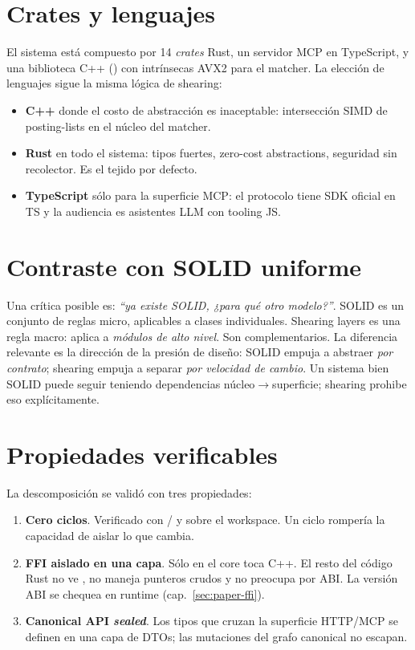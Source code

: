 \section{Crates y lenguajes}

El sistema está compuesto por 14 \emph{crates} Rust, un servidor
MCP en TypeScript, y una biblioteca C++ ()
con intrínsecas AVX2 para el matcher. La elección de lenguajes
sigue la misma lógica de shearing:

\begin{itemize}
    \item \textbf{C++} donde el costo de abstracción es inaceptable:
    intersección SIMD de posting-lists en el núcleo del matcher.
    \item \textbf{Rust} en todo el sistema: tipos fuertes, zero-cost
    abstractions, seguridad sin recolector. Es el tejido por
    defecto.
    \item \textbf{TypeScript} sólo para la superficie MCP: el
    protocolo tiene SDK oficial en TS y la audiencia es
    asistentes LLM con tooling JS.
\end{itemize}

\section{Contraste con SOLID uniforme}

Una crítica posible es: \emph{``ya existe SOLID, ¿para qué otro
modelo?''}. SOLID es un conjunto de reglas micro, aplicables a
clases individuales. Shearing layers es una regla macro: aplica a
\emph{módulos de alto nivel}. Son complementarios. La diferencia
relevante es la dirección de la presión de diseño: SOLID empuja a
abstraer \emph{por contrato}; shearing empuja a separar \emph{por
velocidad de cambio}. Un sistema bien SOLID puede seguir teniendo
dependencias núcleo$\to$superficie; shearing prohibe eso
explícitamente.

\section{Propiedades verificables}

La descomposición se validó con tres propiedades:

\begin{enumerate}
    \item \textbf{Cero ciclos}. Verificado con
    / y 
    sobre el workspace. Un ciclo rompería la capacidad de aislar
    lo que cambia.
    \item \textbf{FFI aislado en una capa}. Sólo
     en el core toca C++. El resto del código
    Rust no ve , no maneja punteros crudos y no
    preocupa por ABI. La versión ABI se chequea en runtime
    (cap.~\ref{sec:paper-ffi}).
    \item \textbf{Canonical API \emph{sealed}}. Los tipos
    que cruzan la superficie HTTP/MCP se definen en una capa de
    DTOs; las mutaciones del grafo canonical no escapan.
\end{enumerate}

